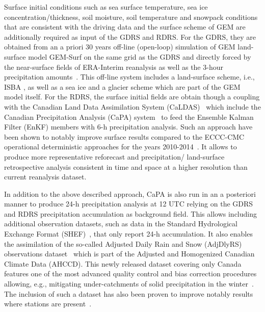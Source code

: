 \documentclass{article}
\begin{document}
	Surface initial conditions such as sea surface temperature, sea ice concentration/thickness, soil moisture, soil temperature and snowpack conditions that are consistent with the driving data and the surface scheme of GEM are additionally  required as input of the GDRS and RDRS.
	For the GDRS, they are obtained from an a priori 30 years off-line (open-loop) simulation of GEM land-surface model GEM-Surf \citep{carrera2010,bernier2012} on the same grid as the GDRS and directly forced by the near-surface fields of ERA-Interim reanalysis as well as the 3-hour precipitation amounts~\citep{gagnon2015}.
	This off-line system includes a land-surface scheme, i.e., ISBA \citep{noilhan1989,noilhan1996}, as well as a sea ice and a glacier scheme which are part of the GEM model itself. 
	For the RDRS, the surface initial fields are obtain though a coupling with the Canadian Land Data Assimilation System (CaLDAS)~\citep{balsamo2007,carrera2015} which include the Canadian Precipitation Analysis (CaPA) system~\citep{mahfouf2007,lespinas2015} to feed the Ensemble Kalman Filter (EnKF) members with 6-h precipitation analysis. Such an approach have been shown to notably improve surface results compared to the ECCC-CMC operational deterministic approaches for the years 2010-2014~\citep{gasset2018a}. It allows to produce more representative reforecast and precipitation/ land-surface retrospective analysis consistent in time and space at a higher resolution than current reanalysis dataset.
	
	In addition to the above described approach, CaPA is also run in an a posteriori manner to produce 24-h precipitation analysis at 12 UTC relying on the GDRS and RDRS precipitation accumulation as background field. This allows including additional observation datasets, such as data in the Standard Hydrological Exchange Format (SHEF)~\citep{bissell1984}, that only report 24-h accumulation. It also enables the assimilation of the so-called Adjusted Daily Rain and Snow (AdjDlyRS) observations dataset~\citep{wang2017} which is part of the Adjusted and Homogenized Canadian Climate Data (AHCCD). This newly released dataset covering only Canada features one of the most advanced quality control and bias correction procedures allowing, e.g., mitigating under-catchments of solid precipitation in the winter~\citep{wang2017}. The inclusion of such a dataset has also been proven to improve notably results where stations are present~\citep{gasset2018a}.
	
\end{document}
